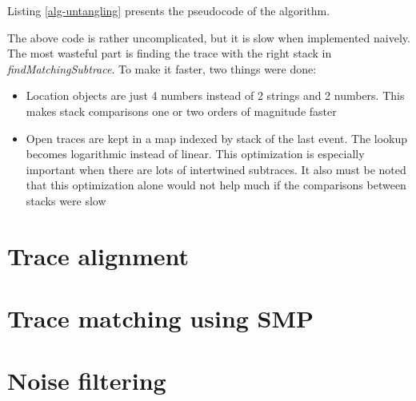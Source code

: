 Listing \ref{alg-untangling} presents the pseudocode of the algorithm.



The above code is rather uncomplicated, but it is slow when implemented naively.
The most wasteful part is finding the trace with the right stack in \emph{findMatchingSubtrace}.
To make it faster, two things were done:
\begin{itemize}
  \item Location objects are just 4 numbers instead of 2 strings and 2 numbers. This makes stack comparisons
           one or two orders of magnitude faster
  \item Open traces are kept in a map indexed by stack of the last event. 
  			The lookup becomes logarithmic instead of linear. This optimization is especially important when there are lots
  			of intertwined subtraces. It also must be noted that this optimization alone would not help much if the comparisons 
  			between stacks were slow
\end{itemize} 

\section{Trace alignment}
\label{trace-alignment}

\cite{ieee:alignment-and-slicing}

\section{Trace matching using SMP}

\section{Noise filtering}


